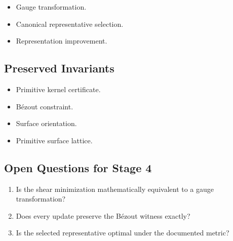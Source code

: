 \begin{itemize}
\item Gauge transformation.
\item Canonical representative selection.
\item Representation improvement.
\end{itemize}

\subsection{Preserved Invariants}

\begin{itemize}
\item Primitive kernel certificate.
\item Bézout constraint.
\item Surface orientation.
\item Primitive surface lattice.
\end{itemize}

\subsection{Open Questions for Stage 4}

\begin{enumerate}
\item Is the shear minimization mathematically equivalent to a gauge transformation?
\item Does every update preserve the Bézout witness exactly?
\item Is the selected representative optimal under the documented metric?
\end{enumerate}
